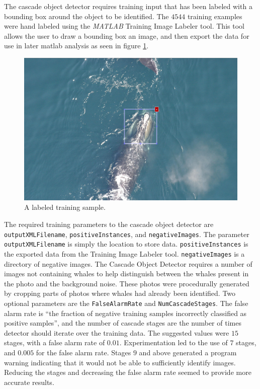 \documentclass[10pt]{IEEEtran}
\newcommand{\?}{\stackrel{?}{=}}
\begin{document}
The cascade object detector requires training input that has been labeled with
a bounding box around the object to be identified. The $4544$ training examples
were hand labeled using the \textit{MATLAB} Training Image Labeler tool. 
This tool allows the user to draw a bounding box an image, and then export the
data for use in later matlab analysis as seen in figure \ref{box}.

\begin{figure}[H]
\begin{center}
\captionsetup{justification=centering}
\includegraphics[scale=.2]{box.png}
\caption{A labeled training sample.}
\label{box}
\end{center}
\end{figure} 

The required training parameters to the cascade object detector are 
\texttt{outputXMLFilename}, \texttt{positiveInstances}, 
and \texttt{negativeImages}\cite{cod}.
The parameter \texttt{outputXMLFilename} is simply the location to store data.
\texttt{positiveInstances} is the exported data from the Training Image Labeler
tool. \texttt{negativeImages} is a directory of negative images. The Cascade
Object Detector requires a number of images not containing whales to help
distinguish between the whales present in the photo and the background noise\cite{cod}.
These photos were procedurally generated by cropping parts of photos where 
whales had already been identified.
Two optional parameters are the \texttt{FalseAlarmRate} and \texttt{NumCascadeStages}.
The false alarm rate is ``the fraction of negative training samples incorrectly
classified as positive samples'', and the number of cascade stages are the number
of times detector should iterate over the training data. The suggested values
were $15$ stages, with a false alarm rate of $0.01$. Experimentation led to 
the use of $7$ stages, and $0.005$ for the false alarm rate. Stages $9$ and 
above generated a program warning indicating that it would not be able to 
sufficiently identify images. Reducing the stages and decreasing the false 
alarm rate seemed to provide more accurate results.
\end{document}
